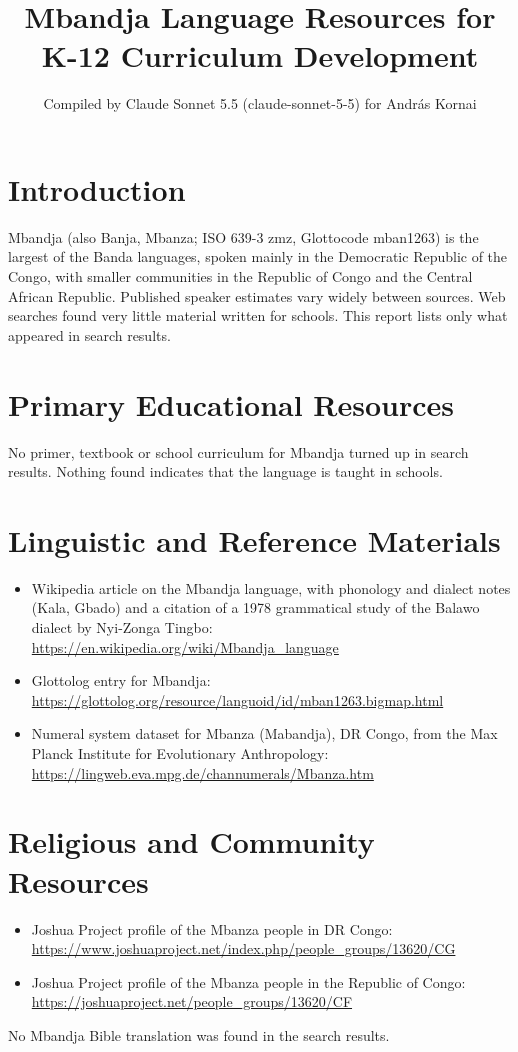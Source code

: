 \documentclass[12pt]{article}
\title{Mbandja Language Resources for K-12 Curriculum Development}
\author{Compiled by Claude Sonnet 5.5 (claude-sonnet-5-5) for Andr\'as Kornai}
\date{}
\begin{document}
\maketitle

\section{Introduction}
Mbandja (also Banja, Mbanza; ISO 639-3 zmz, Glottocode mban1263) is the largest of the Banda languages, spoken mainly in the Democratic Republic of the Congo, with smaller communities in the Republic of Congo and the Central African Republic. Published speaker estimates vary widely between sources. Web searches found very little material written for schools. This report lists only what appeared in search results.

\section{Primary Educational Resources}
No primer, textbook or school curriculum for Mbandja turned up in search results. Nothing found indicates that the language is taught in schools.

\section{Linguistic and Reference Materials}
\begin{itemize}
\item Wikipedia article on the Mbandja language, with phonology and dialect notes (Kala, Gbado) and a citation of a 1978 grammatical study of the Balawo dialect by Nyi-Zonga Tingbo: \url{https://en.wikipedia.org/wiki/Mbandja_language}
\item Glottolog entry for Mbandja: \url{https://glottolog.org/resource/languoid/id/mban1263.bigmap.html}
\item Numeral system dataset for Mbanza (Mabandja), DR Congo, from the Max Planck Institute for Evolutionary Anthropology: \url{https://lingweb.eva.mpg.de/channumerals/Mbanza.htm}
\end{itemize}

\section{Religious and Community Resources}
\begin{itemize}
\item Joshua Project profile of the Mbanza people in DR Congo: \url{https://www.joshuaproject.net/index.php/people_groups/13620/CG}
\item Joshua Project profile of the Mbanza people in the Republic of Congo: \url{https://joshuaproject.net/people_groups/13620/CF}
\end{itemize}
No Mbandja Bible translation was found in the search results.
\end{document}
